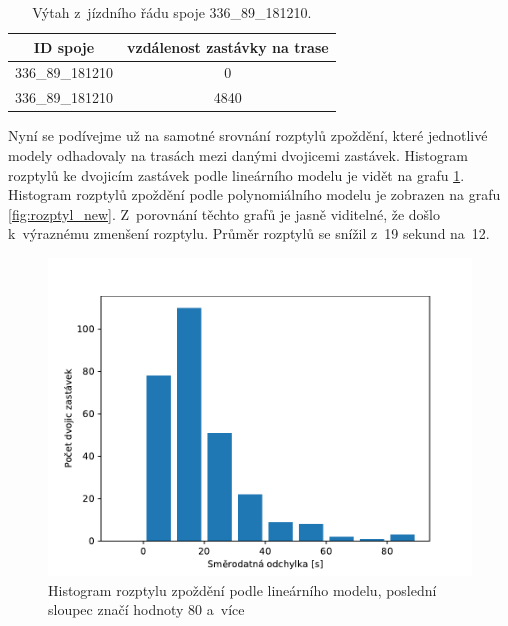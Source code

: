 \begin{center}
   \begin{table}[ht]
\centering
\begin{tabular}{|c|c|}
\hline
ID spoje & vzdálenost zastávky na trase \\ \hline \hline
336\_89\_181210 & 0 \\ \hline
336\_89\_181210 & 4840 \\ \hline
\end{tabular}
\label{table:9270_ride}
\caption{Výtah z~jízdního řádu spoje 336\_89\_181210.}
\end{table}
\end{center}


\bigbreak


Nyní se podívejme už na samotné srovnání rozptylů zpoždění, které jednotlivé modely odhadovaly na trasách mezi danými dvojicemi zastávek. Histogram rozptylů ke dvojicím zastávek podle lineárního modelu je vidět na grafu \ref{fig:rozptyl_old}. Histogram rozptylů zpoždění podle polynomiálního modelu je zobrazen na grafu \ref{fig:rozptyl_new}. Z~porovnání těchto grafů je jasně viditelné, že došlo k~výraznému zmenšení rozptylu. Průměr rozptylů se snížil z~19 sekund na~12.


\begin{figure}
   \centering
 \includegraphics[width=\linewidth]{../img/rozptyl_old}
 \caption{Histogram rozptylu zpoždění podle lineárního modelu, poslední sloupec značí hodnoty 80 a~více}
 \label{fig:rozptyl_old}
\end{figure}


